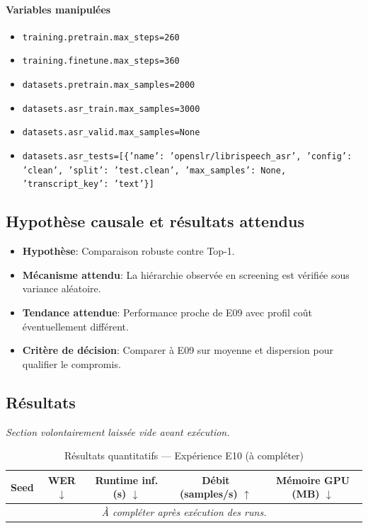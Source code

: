\documentclass[11pt,a4paper]{article}
\begin{document}
\paragraph{Variables manipulées}
\begin{itemize}
\item \texttt{training.pretrain.max\_steps=260}
\item \texttt{training.finetune.max\_steps=360}
\item \texttt{datasets.pretrain.max\_samples=2000}
\item \texttt{datasets.asr\_train.max\_samples=3000}
\item \texttt{datasets.asr\_valid.max\_samples=None}
\item \texttt{datasets.asr\_tests=[\{'name': 'openslr/librispeech\_asr', 'config': 'clean', 'split': 'test.clean', 'max\_samples': None, 'transcript\_key': 'text'\}]}
\end{itemize}

\subsection{Hypothèse causale et résultats attendus}
\begin{itemize}[leftmargin=1.2cm]
\item \textbf{Hypothèse}: Comparaison robuste contre Top-1.
\item \textbf{Mécanisme attendu}: La hiérarchie observée en screening est vérifiée sous variance aléatoire.
\item \textbf{Tendance attendue}: Performance proche de E09 avec profil coût éventuellement différent.
\item \textbf{Critère de décision}: Comparer à E09 sur moyenne et dispersion pour qualifier le compromis.
\end{itemize}

\subsection{Résultats}
\textit{Section volontairement laissée vide avant exécution.}

\begin{table}[H]
\centering
\caption{Résultats quantitatifs --- Expérience E10 (à compléter)}
\begin{tabular}{lcccc}
\toprule
Seed & WER $\downarrow$ & Runtime inf. (s) $\downarrow$ & Débit (samples/s) $\uparrow$ & Mémoire GPU (MB) $\downarrow$ \\
\midrule
\multicolumn{5}{c}{\textit{À compléter après exécution des runs.}} \\
\bottomrule
\end{tabular}
\end{table}
\end{document}
